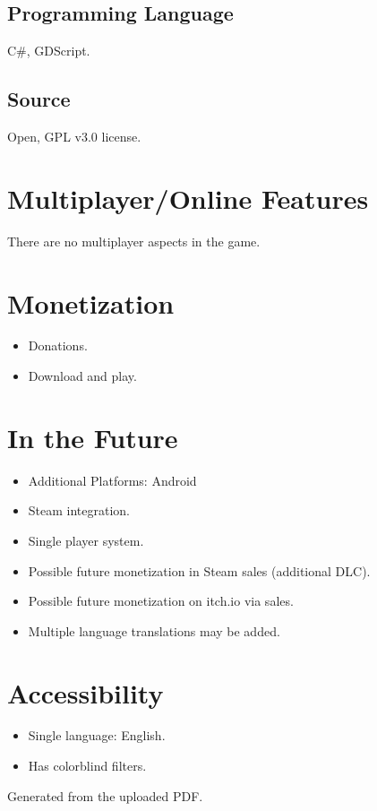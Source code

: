 \documentclass[11pt,a4paper]{report}
\begin{document}
\subsection{Programming Language}
C\#, GDScript.

\subsection{Source}
Open, GPL v3.0 license.

\section{Multiplayer/Online Features}
There are no multiplayer aspects in the game.

\section{Monetization}
\begin{itemize}
  \item Donations.
  \item Download and play.
\end{itemize}

\section{In the Future}
\begin{itemize}
  \item Additional Platforms: Android
  \item Steam integration.
  \item Single player system.
  \item Possible future monetization in Steam sales (additional DLC).
  \item Possible future monetization on itch.io via sales.
  \item Multiple language translations may be added.
\end{itemize}

\section{Accessibility}
\begin{itemize}
  \item Single language: English.
  \item Has colorblind filters.
\end{itemize}

\vfill
\noindent Generated from the uploaded PDF.
\end{document}
